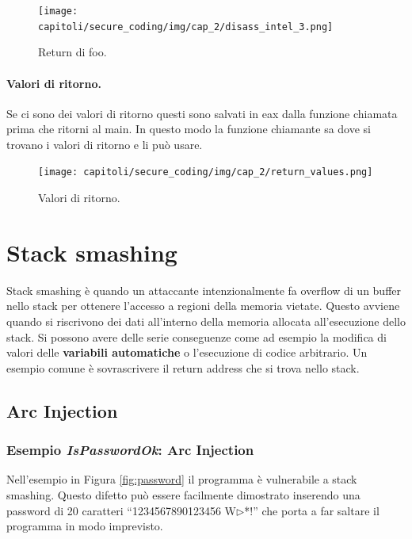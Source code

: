 \begin{figure}[H]
    \centering
    \texttt{[image: capitoli/secure\_coding/img/cap\_2/disass\_intel\_3.png]}
    \caption{Return di foo.}\label{fig:disass_intel_3}
\end{figure}

\paragraph{Valori di ritorno.} Se ci sono dei valori di ritorno questi sono salvati
in eax dalla funzione chiamata prima che ritorni al main. In questo modo la
funzione chiamante sa dove si trovano i valori di ritorno e li può usare.

\begin{figure}[H]
    \centering
    \texttt{[image: capitoli/secure\_coding/img/cap\_2/return\_values.png]}
    \caption{Valori di ritorno.}\label{fig:ret_values}
\end{figure}

\newpage

\section{Stack smashing}

Stack smashing è quando un attaccante intenzionalmente fa overflow di un buffer nello
stack per ottenere l'accesso a regioni della memoria vietate.
Questo avviene quando si riscrivono dei dati all'interno della memoria allocata
all'esecuzione dello stack. Si possono avere delle serie conseguenze come ad esempio
la modifica di valori delle \textbf{variabili automatiche} o l'esecuzione di codice
arbitrario. Un esempio comune è sovrascrivere il return address che si trova nello
stack.

\subsection{Arc Injection}

\subsubsection{Esempio \textit{IsPasswordOk}: Arc Injection}

Nell'esempio in Figura \ref{fig:password} il programma è vulnerabile a stack smashing.
Questo difetto può essere facilmente dimostrato inserendo una password di 20 caratteri
``1234567890123456 W$\triangleright$*!'' che porta a far saltare il programma in modo
imprevisto.

